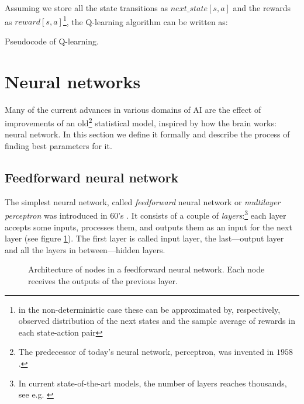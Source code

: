 Assuming we store all the state transitions as $next\_state[s, a]$ and the rewards as $reward[s, a]$\footnote{in the non-deterministic case these can be approximated by, respectively, observed distribution of the next states and the sample average of rewards in each state-action pair}, the Q-learning algorithm can be written as: 

\begin{algorithm} \label{qlearning-pseudo}
  \caption{Pseudocode of Q-learning.}
\end{algorithm}
\section{Neural networks}
Many of the current advances in various domains of AI are the effect of improvements of an old\footnote{The predecessor of today's neural network, perceptron, was invented in $1958$ \cite{perceptron}.} statistical model, inspired by how the brain works: neural network. In this section we define it formally and describe the process of finding best parameters for it.

\subsection{Feedforward neural network}
The simplest neural network, called \emph{feedforward} neural network or \emph{multilayer perceptron} was introduced in 60's \cite{mlp}.
It consists of a couple of \emph{layers}:\footnote{In current state-of-the-art models, the number of layers reaches thousands, see e.g. \cite{stochastic}} each layer accepts some inputs, processes them, and outputs them as an input for the next layer (see figure \ref{ann-layers}). The first layer is called input layer, the last---output layer and all the layers in between---hidden layers.
\begin{figure}[h]
  \centering
  \resizebox{0.6\textwidth}{!}{
  
  }
  \caption{Architecture of nodes in a feedforward neural network. Each node receives the outputs of the previous layer.}\label{ann-layers} 
\end{figure}

